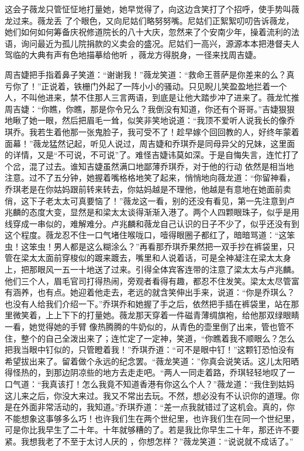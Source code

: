 \documentclass{article}
\begin{document}
这会子薇龙只管怔怔地打量她，她早觉得了，向这边含笑打了个招呼，使手势叫薇龙过来。薇龙丢
\newpage
了个眼色，又向尼姑们略努努嘴。尼姑们正絮絮叨叨告诉薇龙，她们如何如何筹备庆祝修道院长的八十大庆，忽然来了个安南少年，操着流利的法语，询问最近为孤儿院捐款的义卖会的盛况。尼姑们一高兴，源源本本把港督夫人驾临的大典有声有色地描摹给他听
，薇龙方得脱身，一径来找周吉婕。 

周吉婕把手指着鼻子笑道：“谢谢我！”薇龙笑道：“救命王菩萨是你差来的么？真亏你了！”正说着，铁栅门外起了一阵小小的骚动。只见睨儿笑盈盈地拦着一个人，不叫他进来，禁不住那人三言两语，到底是让他大踏步冲了进来了。薇龙忙推周吉婕：“你瞧，你瞧，那是你令兄么？我倒没有知道，你还有个哥哥。”吉婕狠狠地瞅了她一眼，然后把眉毛一耸，似笑非笑地说道：“我顶不爱听人说我长的像乔琪乔。我若生着他那一张鬼脸子，我可受不了！趁早嫁个回回教的人，好终年蒙着面幕！”薇龙猛然记起，听见人说过，周吉婕和乔琪乔是同母异父的兄妹，这里面的详情，又是“不可说，不可说”了。难怪吉婕讳莫如深。于是自悔失言，连忙打了个岔，混了过去。谁知吉婕虽然满口地鄙薄乔琪乔，对于他的行动
\newpage
依然是相当地注意。过不了五分钟，她握着嘴格格地笑了起来，悄悄地向薇龙道：“你留神看，乔琪老是在你姑妈跟前转来转去，你姑妈越是不理他，他越是有意地在她面前卖俏，这下子老太太可真要恼了！”薇龙这一看，别的还没有看见，第一先注意到卢兆麟的态度大变，显然是和梁太太谈得渐渐入港了。两个人四颗眼珠子，似乎是用线穿成一串似的，难解难分。卢兆麟和薇龙自己认识的日子不少了，似乎还没有到这个程度。薇龙忍不住一口气堵住喉咙口，噎得眼圈子都红了，暗暗骂道：“这笨虫！这笨虫！男人都是这么糊涂么？”再看那乔琪乔果然把一双手抄在裤袋里，只管在梁太太面前穿梭似的踱来踱去，嘴里和人说着话，可是全神凝注在梁太太身上，把那眼风一五一十地送了过来。引得全体宾客连带的注意了梁太太与卢兆麟。他们三个人，眉毛官司打得热闹，旁观者看得有趣，都忍不住发笑。梁太太尽管富有涵养，也有点。她迎着他走去，老远的就含笑伸出手来，说道：“你是乔琪么？也没有人给我们介绍一下。”乔琪乔和她握了手之后，依然把手插在裤袋里，站在那里微笑着，上上下下的打量她。薇龙那天穿着一件磁青薄绸旗袍，给他那双绿眼睛一看，她觉得她的手臂
\newpage
像热腾腾的牛奶似的，从青色的壶里倒了出来，管也管不住，整个的自己全泼出来了；连忙定了一定神，笑道，“你瞧着我不顺眼么？怎么把我当眼中钉似的，只管瞪着我！”乔琪乔道：“可不是眼中钉！”这颗钉恐怕没有希望拔出来了。留着做个永远的纪念罢。“薇龙笑道：”你真会说笑话。这儿太阳晒得怪热的，到那边阴凉些的地方去走走吧。“两人一同走着路，乔琪轻轻地叹了一口气道：“我真该打！怎么我竟不知道香港有你这么个人？”薇龙道：“我住到姑妈这儿来之后，你没大来过。我又不常出去玩。不然，想必没有不认识你的道理。你是在外面非常活动的，我知道。”乔琪乔道：“差一点我就错过了这机会。真的，你不能想象这事够多么巧！也许我们生在两个世纪里，也许我们生在同一个世纪里，可是你比我早生了二十年。十年就够糟的了。若是我比你早生二十年，那还许不要紧。我想我老了不至于太讨人厌的
，你想怎样？”薇龙笑道：“说说就不成话了。” 
\end{document}
